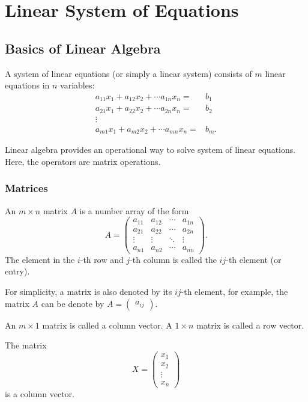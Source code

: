\chapter{Linear System of Equations}

\section{Basics of Linear Algebra}

A system of linear equations (or simply a linear system) consists of $m$ linear equations in $n$ variables:
\begin{equation}\label{eq:linearsystem}
  \begin{aligned}
  a_{11}x_1+a_{12}x_2+\cdots a_{1n}x_n=&b_1\\  
  a_{21}x_1+a_{22}x_2+\cdots a_{2n}x_n=&b_2\\  
  \vdots\\
  a_{m1}x_1+a_{m2}x_2+\cdots a_{mn}x_n=&b_m.  
  \end{aligned}  
\end{equation}

Linear algebra provides an operational way to solve system of linear equations. Here, the operators are matrix operations.

\subsection*{Matrices}

An $m\times n$ matrix $A$ is a number array of the form
\[
  A=
  \begin{pmatrix}
  a_{11} & a_{12} &\cdots & a_{1n}\\
  a_{21} & a_{22} &\cdots & a_{2n}\\
  \vdots & \vdots & \ddots & \vdots\\
  a_{n1} & a_{n2} &\cdots & a_{nn}
\end{pmatrix}.
\]
The element in the $i$-th row and $j$-th column is called the $ij$-th element (or entry).

For simplicity, a matrix is also denoted by its $ij$-th element, for example, the matrix $A$ can be denote by $A=\begin{pmatrix}  a_{ij} \end{pmatrix}$.

An $m\times 1$ matrix is called a column vector. A $1\times n$ matrix is called a row vector. 

\begin{example}
  The matrix
  \[X=\begin{pmatrix}
    x_1\\
    x_2\\
    \vdots\\
    x_n
  \end{pmatrix}\]
  is a column vector.
\end{example}

